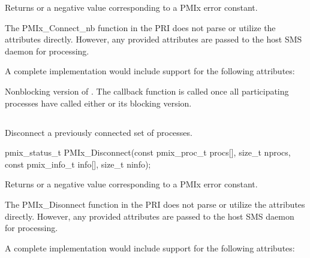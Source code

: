 Returns  or a negative value corresponding to a PMIx error constant.

\priattr
The PMIx_Connect_nb function in the \ac{PRI} does not parse or utilize the attributes directly. However, any provided attributes are passed to the host \ac{SMS} daemon for processing.

\optattr
A complete implementation would include support for the following attributes:


\descr

Nonblocking version of . The callback function is called once all participating processes have called either  or its blocking version.


\subsection{}

\summary

Disconnect a previously connected set of processes.

\format

\cspecificstart
\begin{codepar}
pmix_status_t
PMIx_Disconnect(const pmix_proc_t procs[], size_t nprocs,
                const pmix_info_t info[], size_t ninfo);
\end{codepar}
\cspecificend

\begin{arglist}
\end{arglist}

Returns  or a negative value corresponding to a PMIx error constant.

\priattr
The PMIx_Disonnect function in the \ac{PRI} does not parse or utilize the attributes directly. However, any provided attributes are passed to the host \ac{SMS} daemon for processing.

\optattr
A complete implementation would include support for the following attributes:

